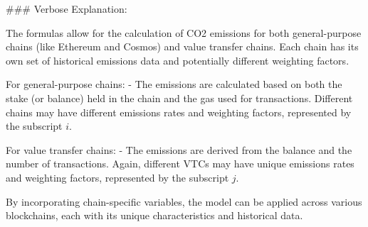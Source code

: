 \documentclass{article}
\begin{document}
### Verbose Explanation:

The formulas allow for the calculation of CO2 emissions for both general-purpose chains (like Ethereum and Cosmos) and value transfer chains. Each chain has its own set of historical emissions data and potentially different weighting factors. 

For general-purpose chains:
- The emissions are calculated based on both the stake (or balance) held in the chain and the gas used for transactions. Different chains may have different emissions rates and weighting factors, represented by the subscript \( i \).

For value transfer chains:
- The emissions are derived from the balance and the number of transactions. Again, different VTCs may have unique emissions rates and weighting factors, represented by the subscript \( j \).

By incorporating chain-specific variables, the model can be applied across various blockchains, each with its unique characteristics and historical data.
\end{document}
